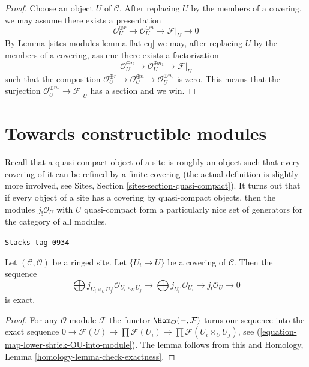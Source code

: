 \begin{proof}
Choose an object $U$ of $\mathcal{C}$.
After replacing $U$ by the members of a covering, we may
assume there exists a presentation
$$
\mathcal{O}_U^{\oplus r} \to
\mathcal{O}_U^{\oplus n} \to \mathcal{F}|_U \to 0
$$
By Lemma \ref{sites-modules-lemma-flat-eq} we may, after replacing $U$
by the members of a covering, assume there exists a factorization
$$
\mathcal{O}_U^{\oplus n} \to
\mathcal{O}_U^{\oplus n_1} \to \mathcal{F}|_U
$$
such that the composition
$\mathcal{O}_U^{\oplus r} \to \mathcal{O}_U^{\oplus n}
\to \mathcal{O}_U^{\oplus n_r}$ is zero.
This means that the surjection $\mathcal{O}_U^{\oplus n_r} \to \mathcal{F}|_U$
has a section and we win.
\end{proof}

\section{Towards constructible modules}
\label{sites-modules-section-constructible}
Recall that a quasi-compact object of a site is roughly an object
such that every covering of it can be refined by a finite covering
(the actual definition is slightly more involved, see
Sites, Section \ref{sites-section-quasi-compact}). It turns out that
if every object of a site has a covering by quasi-compact objects, then
the modules $j_!\mathcal{O}_U$ with $U$ quasi-compact form a particularly
nice set of generators for the category of all modules.

\begin{lemma}
\label{sites-modules-lemma-covering-gives-surjection}
\href{https://stacks.math.columbia.edu/tag/0934}{\texttt{Stacks tag 0934}}

Let $(\mathcal{C}, \mathcal{O})$ be a ringed site. Let $\{U_i \to U\}$
be a covering of $\mathcal{C}$. Then the sequence
$$
\bigoplus j_{U_i \times_U U_j!}\mathcal{O}_{U_i \times_U U_j} \to
\bigoplus j_{U_i!}\mathcal{O}_{U_i} \to j_!\mathcal{O}_U \to 0
$$
is exact.
\end{lemma}

\begin{proof}
For any $\mathcal{O}$-module $\mathcal{F}$ the functor
$\Hom_\mathcal{O}(-, \mathcal{F})$ turns our sequence into the exact sequence
$0 \to \mathcal{F}(U) \to \prod \mathcal{F}(U_i) \to
\prod \mathcal{F}(U_i \times_U U_j)$, see
(\ref{equation-map-lower-shriek-OU-into-module}). The lemma follows from
this and
Homology, Lemma \ref{homology-lemma-check-exactness}.
\end{proof}

